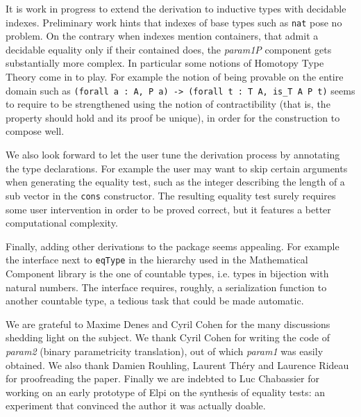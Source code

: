 \documentclass[a4paper,UKenglish,cleveref, autoref]{lipics-v2019}
\newcommand{\derive}[1]{\emph{#1}}
\begin{document}
It is work in progress to extend the derivation to 
inductive types with decidable indexes. Preliminary work hints that
indexes of base types such as \lstinline+nat+ pose no problem.
On the contrary when indexes mention containers, that admit a decidable
equality only if their contained does,
the \derive{param1P} component gets 
substantially more complex. In particular some notions of Homotopy Type Theory
come in to play. For example the notion of being provable on the entire domain
such as \lstinline+(forall a : A, P a) -> (forall t : T A, is_T A P t)+ seems
to require to be strengthened using the notion of contractibility (that
is, the property should hold and its proof be unique), in order for the
construction to compose well.


We also look forward to let the user tune
the derivation process by annotating the type declarations.
For example the user may want to skip
certain arguments when generating the equality test, such as the
integer describing the length of a sub vector in the \lstinline+cons+
constructor. The resulting equality
test surely requires some user intervention in order 
to be proved correct, but it features a better computational complexity.

Finally, adding other derivations to the package seems appealing. For example
the interface next to \lstinline+eqType+ in the hierarchy used
in the Mathematical Component library is the one of countable types,
i.e. types in bijection with natural numbers. The interface
requires, roughly, a serialization function to another countable
type, a tedious task that could be made automatic.

We are grateful to Maxime Denes and Cyril Cohen for the many discussions
shedding light on the subject. We thank Cyril Cohen for writing the code 
of \derive{param2} (binary parametricity translation), out of which
\derive{param1} was easily obtained.  
We also thank Damien Rouhling, Laurent Th\'ery and Laurence Rideau
for proofreading the paper.
Finally we are indebted
to Luc Chabassier for working on an early prototype of Elpi on
the synthesis of equality tests: an experiment that convinced
the author it was actually doable.





\end{document}
